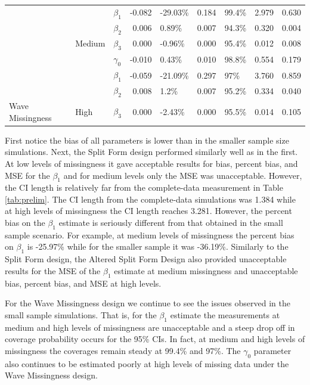 \documentclass{svjour3}\usepackage[]{graphicx}\usepackage[]{color}
\newenvironment{knitrout}{}{} %
\begin{document}
\begin{knitrout}
\begin{table}[!h]
{\begin{tabular}[t]{l|l|l|r|l|r|l|r|r}
 &  & $\beta_1$ & -0.082 & -29.03\% & 0.184 & 99.4\% & 2.979 & 0.630\\

 &  & $\beta_2$ & 0.006 & 0.89\% & 0.007 & 94.3\% & 0.320 & 0.004\\

 & \multirow{-4}{*}{\raggedright\arraybackslash Medium} & $\beta_3$ & 0.000 & -0.96\% & 0.000 & 95.4\% & 0.012 & 0.008\\

 &  & $\gamma_0$ & -0.010 & 0.43\% & 0.010 & 98.8\% & 0.554 & 0.179\\

 &  & $\beta_1$ & -0.059 & -21.09\% & 0.297 & 97\% & 3.760 & 0.859\\

 &  & $\beta_2$ & 0.008 & 1.2\% & 0.007 & 95.2\% & 0.334 & 0.040\\

\multirow{-12}{*}{\raggedright\arraybackslash Wave Missingness} & \multirow{-4}{*}{\raggedright\arraybackslash High} & $\beta_3$ & 0.000 & -2.43\% & 0.000 & 95.5\% & 0.014 & 0.105\\
\hline
\end{tabular}}
\end{table}


\end{knitrout}

First notice the bias of all parameters is lower than in the smaller sample size simulations. Next, the Split Form design performed similarly well as in the first. At low levels of missingness it gave acceptable results for bias, percent bias, and MSE for the $\beta_1$ and for medium levels only the MSE was unacceptable. However, the CI length is relatively far from the complete-data measurement in Table \ref{tab:prelim}. The CI length from the complete-data simulations was 1.384 while at high levels of missingness the CI length reaches 3.281. However, the percent bias on the $\beta_1$ estimate is seriously different from that obtained in the small sample scenario. For example, at medium levels of missingness the percent bias on $\beta_1$ is -25.97\% while for the smaller sample it was -36.19\%.
Similarly to the Split Form design, the Altered Split Form Design also provided unacceptable results for the MSE of the $\beta_1$ estimate at medium missingness and unacceptable bias, percent bias, and MSE at high levels.  \par
For the Wave Missingness design we continue to see the issues observed in the small sample simulations. That is, for the $\beta_1$ estimate the measurements at medium and high levels of missingness are unacceptable and a steep drop off in coverage probability occurs for the 95\% CIs. In fact, at medium and high levels of missingness the coverages remain steady at 99.4\% and 97\%. The $\gamma_0$ parameter also continues to be estimated poorly at high levels of missing data under the Wave Missingness design. \par
\end{document}
